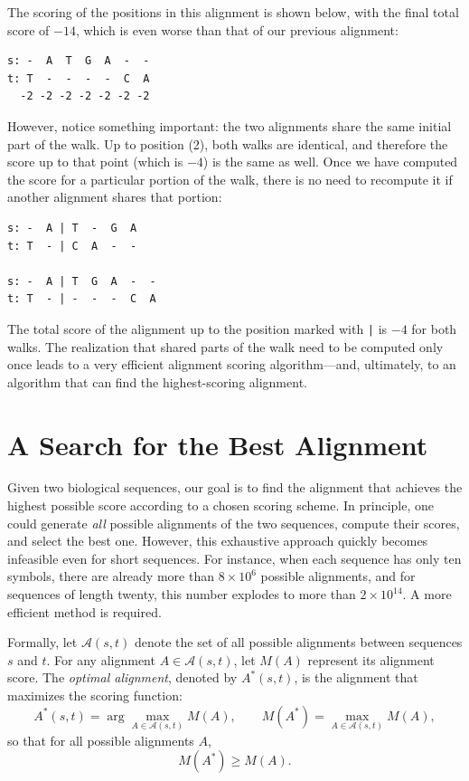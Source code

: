 The scoring of the positions in this alignment is shown below, with the final total score of $-14$, which is even worse than that of our previous alignment:

\begin{verbatim}
s: -  A  T  G  A  -  -
t: T  -  -  -  -  C  A
  -2 -2 -2 -2 -2 -2 -2
\end{verbatim}

However, notice something important: the two alignments share the same initial part of the walk. Up to position (2), both walks are identical, and therefore the score up to that point (which is $-4$) is the same as well. Once we have computed the score for a particular portion of the walk, there is no need to recompute it if another alignment shares that portion:

\begin{verbatim}
s: -  A | T  -  G  A
t: T  - | C  A  -  -

s: -  A | T  G  A  -  -
t: T  - | -  -  -  C  A
\end{verbatim}

The total score of the alignment up to the position marked with {\tt |} is $-4$ for both walks. The realization that shared parts of the walk need to be computed only once leads to a very efficient alignment scoring algorithm—and, ultimately, to an algorithm that can find the highest-scoring alignment.

\section{A Search for the Best Alignment}

Given two biological sequences, our goal is to find the alignment that achieves the highest possible score according to a chosen scoring scheme. In principle, one could generate \emph{all} possible alignments of the two sequences, compute their scores, and select the best one. However, this exhaustive approach quickly becomes infeasible even for short sequences. For instance, when each sequence has only ten symbols, there are already more than $8\times 10^6$ possible alignments, and for sequences of length twenty, this number explodes to more than $2\times 10^{14}$. A more efficient method is required.

Formally, let $\mathcal{A}(s,t)$ denote the set of all possible alignments between sequences $s$ and $t$. 
For any alignment $A \in \mathcal{A}(s,t)$, let $M(A)$ represent its alignment score. 
The \emph{optimal alignment}, denoted by $A^*(s,t)$, is the alignment that maximizes the scoring function:
\[
A^*(s,t) = \arg\max_{A \in \mathcal{A}(s,t)} M(A),
\qquad
M(A^*) = \max_{A \in \mathcal{A}(s,t)} M(A),
\]
%
so that for all possible alignments $A$,
%
\[
M(A^*) \ge M(A).
\]

